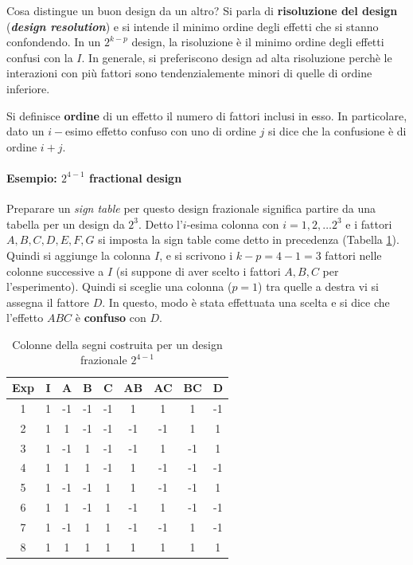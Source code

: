 \documentclass{article}
\begin{document}
Cosa distingue un buon design da un altro? Si parla di \textbf{risoluzione del design} 
(\textbf{\textit{design resolution}}) e si intende il minimo ordine degli effetti che si
stanno confondendo. In un $2^{k-p}$ design, la risoluzione è il minimo ordine degli effetti
confusi con la $I$. In generale, si preferiscono design ad alta risoluzione perchè le 
interazioni con più fattori sono tendenzialemente minori di quelle di ordine inferiore.

Si definisce \textbf{ordine} di un effetto il numero di fattori inclusi in esso. In 
particolare, dato un $i-$esimo effetto confuso con uno di ordine $j$ si dice che la 
confusione è di ordine $i+j$.

\paragraph{Esempio: $2^{4-1}$ fractional design}
Preparare un \textit{sign table} per questo design frazionale significa partire da una 
tabella per un design da $2^3$. Detto l'$i$-esima colonna con $i=1, 2,\dots 2^3$ e i fattori
$A,B,C,D,E,F,G$ si imposta la sign table come detto in precedenza (Tabella \ref{tab:ex-2kp-signmethod}).
Quindi si aggiunge la colonna $I$, e si scrivono i $k-p = 4-1= 3$ fattori nelle colonne
successive a $I$ (si suppone di aver scelto i fattori $A,B,C$ per l'esperimento). Quindi si 
sceglie una colonna ($p=1$) tra quelle a destra vi si assegna il fattore $D$. In questo,
modo è stata effettuata una scelta e si dice che l'effetto $ABC$ è \textbf{confuso} con
$D$.

\begin{table}
  \begin{center}
    \begin{tabular}[c]{|c|c|c|c|c|c|c|c|c|}
      \hline
      \multicolumn{1}{|c|}{\textbf{Exp}} & 
      \multicolumn{1}{c|}{\textbf{I}} & 
      \multicolumn{1}{c|}{\textbf{A}} & 
      \multicolumn{1}{c|}{\textbf{B}} & 
      \multicolumn{1}{c|}{\textbf{C}} & 
      \multicolumn{1}{c|}{\textbf{AB}} & 
      \multicolumn{1}{c|}{\textbf{AC}} & 
      \multicolumn{1}{c|}{\textbf{BC}} & 
      \multicolumn{1}{c|}{\textbf{D}} \\ \hline \hline

      1 & 1 & -1 & -1 & -1 & 1 & 1 & 1 & -1\\ \hline
      2 & 1 & 1 & -1 & -1 & -1 & -1 & 1 & 1\\ \hline
      3 & 1 & -1 & 1 & -1 & -1 & 1 & -1 & 1\\ \hline
      4 & 1 & 1 & 1 & -1 & 1 & -1 & -1 & -1\\ \hline
      5 & 1 & -1 & -1 & 1 & 1 & -1 & -1 & 1\\ \hline
      6 & 1 & 1 & -1 & 1 & -1 & 1 & -1 & -1\\ \hline
      7 & 1 & -1 & 1 & 1 & -1 & -1 & 1 & -1\\ \hline
      8 & 1 & 1 & 1 & 1 & 1 & 1 & 1 & 1\\ \hline
    \end{tabular}
  \end{center}
  \caption{Colonne della segni costruita per un design frazionale $2^{4-1}$}
  \label{tab:ex-2kp-signmethod}
\end{table}
\end{document}
